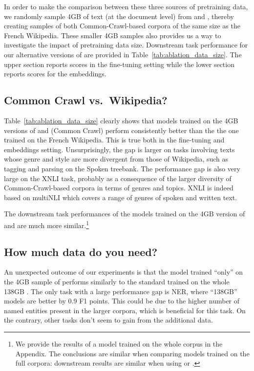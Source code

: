 In order to make the comparison between these three sources of pretraining data, we randomly sample 4GB of text (at the document level) from \oscar and \ccnet, thereby creating samples of both Common-Crawl-based corpora of the same size as the French Wikipedia. These smaller 4GB samples also provides us a way to investigate the impact of pretraining data size. Downstream task performance for our alternative versions of \camembert are provided in Table~\ref{tab:ablation_data_size}.
The upper section reports scores in the fine-tuning setting while the lower section reports scores for the embeddings.

\subsection{Common Crawl vs.~Wikipedia?}
\label{subsec:homogeneityimpact}

Table~\ref{tab:ablation_data_size} clearly shows that models trained on the 4GB versions of \oscar and \ccnet (Common Crawl) perform consistently better than the the one trained on the French Wikipedia. This is true both in the fine-tuning and embeddings setting. Unsurprisingly, the gap is larger on tasks involving texts whose genre and style are more divergent from those of Wikipedia, such as tagging and parsing on the Spoken treebank.
The performance gap is also very large on the XNLI task, probably as a consequence of the larger diversity of Common-Crawl-based corpora in terms of genres and topics. XNLI is indeed based on multiNLI which covers a range of genres of spoken and written text.

The downstream task performances of the models trained on the 4GB version of \ccnet and \oscar are much more similar.\footnote{We provide the results of a model trained on the whole \ccnet corpus in the Appendix. The conclusions are similar when comparing models trained on the full corpora: downstream results are similar when using \oscar or \ccnet.}


\subsection{How much data do you need?}
\label{subsec:sizeimpact}

An unexpected outcome of our experiments is that the model trained ``only'' on the 4GB sample of \oscar performs similarly  to the standard \camembert trained on the whole 138GB \oscar.
The only task with a large performance gap is NER, where  ``138GB'' models are better by 0.9 F1 points. This could be due to the higher number of named entities present in the larger corpora, which is beneficial for this task. On the contrary, other tasks don't seem to gain from the additional data.

